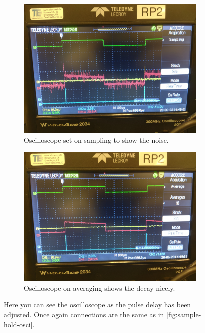 \documentclass[a4paper, 10pt]{article}
\begin{document}
\begin{figure}[H]
    \centering
    \begin{subfigure}{0.45\textwidth}
        \includegraphics[width=\textwidth]{./images/config-width-sampling.jpg}
        \caption{Oscilloscope set on sampling to show the noise.}
        \label{fig:config-width-sampling}
    \end{subfigure}
    \begin{subfigure}{0.45\textwidth}
        \includegraphics[width=\textwidth]{./images/config-width-averaging.jpg}
        \caption{Oscilloscope on averaging shows the decay nicely.}
        \label{fig:config-width-averaging}
    \end{subfigure}
    \caption{Here you can see the oscilloscope as the pulse delay has been adjusted. Once again connections are the same as in \cref{fig:sample-hold-osci}.}
    \label{fig:config-width}
\end{figure}
\end{document}
